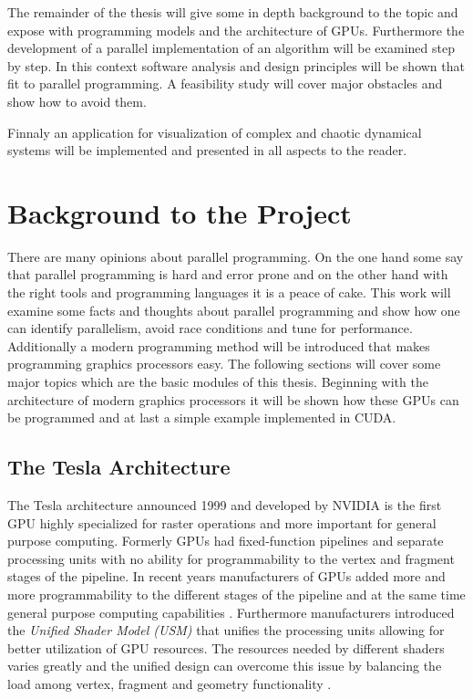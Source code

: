 The remainder of the thesis will give some in depth background to the topic and
expose with programming models and the architecture of GPUs. Furthermore the
development of a parallel implementation of an algorithm will be examined step
by step. In this context software analysis and design principles will be shown
that fit to parallel programming. A feasibility study will cover major obstacles
and show how to avoid them.

Finnaly an application for visualization of complex and chaotic dynamical
systems will be implemented and presented in all aspects to the reader.
\section*{Background to the Project} 
\label{sub:background_to_the_project} 
There are many opinions about parallel programming. On the one hand some say
that parallel programming is hard and error prone and on the other hand with the
right tools and programming languages it is a peace of cake. This work will
examine some facts and thoughts about parallel programming and show how one can
identify parallelism, avoid race conditions and tune for performance.
Additionally a modern programming method will be introduced that makes
programming graphics processors easy. The following sections will cover some
major topics which are the basic modules of this thesis. Beginning with the
architecture of modern graphics processors it will be shown how these GPUs can
be programmed and at last a simple example implemented in CUDA. 

\subsection*{The Tesla Architecture} %
\label{sub:the_tesla_architecture}
The Tesla architecture announced 1999 and developed by NVIDIA is the first
GPU highly specialized for raster operations and more important
for general purpose computing. Formerly GPUs had fixed-function
pipelines and separate processing units with no ability for programmability to
the vertex and fragment stages of the pipeline. In recent years manufacturers of
GPUs added more and more programmability to the different stages
of the pipeline and at the same time general purpose computing capabilities
\cite{citeulike:3844545}. Furthermore manufacturers introduced the \emph{Unified
Shader Model (USM)} that unifies the processing units allowing for better
utilization of \gls{GPU} resources. The resources needed by different
shaders varies greatly and the unified design can overcome this issue by
balancing the load among vertex, fragment and geometry functionality
\cite{citeulike:3145468}.

